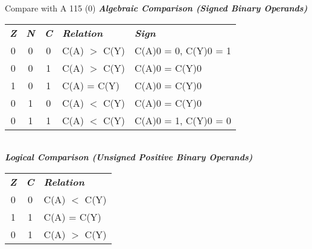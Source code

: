 { {Compare with A} {115 (0)}
\inbif
{}
\inall
\inina
{}
\textbf{\textsl{Algebraic Comparison (Signed Binary Operands)}}\\
\begin{tabular}{c c c l l}
\textit{\textbf{Z}} & 
\textit{\textbf{N}} & 
\textit{\textbf{C}} & 
\textit{\textbf{Relation}} & 
\textit{\textbf{Sign}} \\
0 & 0 & 0 & C(A) $>$ C(Y) & C(A)0 = 0, C(Y)0 = 1 \\
0 & 0 & 1 & C(A) $>$ C(Y) & C(A)0 = C(Y)0 \\
1 & 0 & 1 & C(A) = C(Y) & C(A)0 = C(Y)0 \\
0 & 1 & 0 & C(A) $<$ C(Y) & C(A)0 = C(Y)0 \\
0 & 1 & 1 & C(A) $<$ C(Y) & C(A)0 = 1, C(Y)0 = 0 \\
\end{tabular} \\
\textbf{\textsl{Logical Comparison (Unsigned Positive Binary Operands)}}\\
\begin{tabular}{c c l}
\textit{\textbf{Z}} & 
\textit{\textbf{C}} & 
\textit{\textbf{Relation}} \\
0 & 0 & C(A) $<$ C(Y) \\
1 & 1 & C(A) = C(Y) \\
0 & 1 & C(A) $>$ C(Y) \\
\end{tabular}






}
